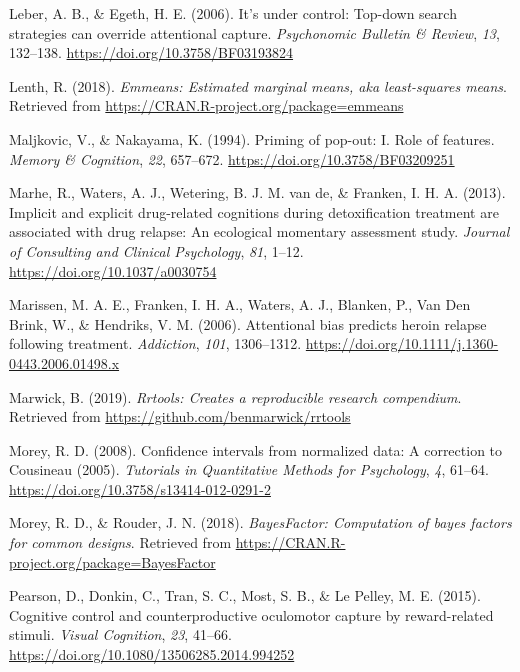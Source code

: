 \documentclass[man, a4paper, noextraspace, 11pt,floatsintext]{apa6}
\theoremstyle{definition}
\theoremstyle{definition}
\theoremstyle{definition}
\theoremstyle{remark}
\begin{document}
\hypertarget{ref-Leber2006}{}
Leber, A. B., \& Egeth, H. E. (2006). It's under control: Top-down
search strategies can override attentional capture. \emph{Psychonomic
Bulletin \& Review}, \emph{13}, 132--138.
\url{https://doi.org/10.3758/BF03193824}

\hypertarget{ref-R-emmeans}{}
Lenth, R. (2018). \emph{Emmeans: Estimated marginal means, aka
least-squares means}. Retrieved from
\url{https://CRAN.R-project.org/package=emmeans}

\hypertarget{ref-Maljkovic1994}{}
Maljkovic, V., \& Nakayama, K. (1994). Priming of pop-out: I. Role of
features. \emph{Memory \& Cognition}, \emph{22}, 657--672.
\url{https://doi.org/10.3758/BF03209251}

\hypertarget{ref-Marhe2013}{}
Marhe, R., Waters, A. J., Wetering, B. J. M. van de, \& Franken, I. H.
A. (2013). Implicit and explicit drug-related cognitions during
detoxification treatment are associated with drug relapse: An ecological
momentary assessment study. \emph{Journal of Consulting and Clinical
Psychology}, \emph{81}, 1--12. \url{https://doi.org/10.1037/a0030754}

\hypertarget{ref-Marissen2006}{}
Marissen, M. A. E., Franken, I. H. A., Waters, A. J., Blanken, P., Van
Den Brink, W., \& Hendriks, V. M. (2006). Attentional bias predicts
heroin relapse following treatment. \emph{Addiction}, \emph{101},
1306--1312. \url{https://doi.org/10.1111/j.1360-0443.2006.01498.x}

\hypertarget{ref-R-rrtools}{}
Marwick, B. (2019). \emph{Rrtools: Creates a reproducible research
compendium}. Retrieved from \url{https://github.com/benmarwick/rrtools}

\hypertarget{ref-Morey2008}{}
Morey, R. D. (2008). Confidence intervals from normalized data: A
correction to Cousineau (2005). \emph{Tutorials in Quantitative Methods
for Psychology}, \emph{4}, 61--64.
\url{https://doi.org/10.3758/s13414-012-0291-2}

\hypertarget{ref-R-BayesFactor}{}
Morey, R. D., \& Rouder, J. N. (2018). \emph{BayesFactor: Computation of
bayes factors for common designs}. Retrieved from
\url{https://CRAN.R-project.org/package=BayesFactor}

\hypertarget{ref-Pearson2015}{}
Pearson, D., Donkin, C., Tran, S. C., Most, S. B., \& Le Pelley, M. E.
(2015). Cognitive control and counterproductive oculomotor capture by
reward-related stimuli. \emph{Visual Cognition}, \emph{23}, 41--66.
\url{https://doi.org/10.1080/13506285.2014.994252}
\end{document}
